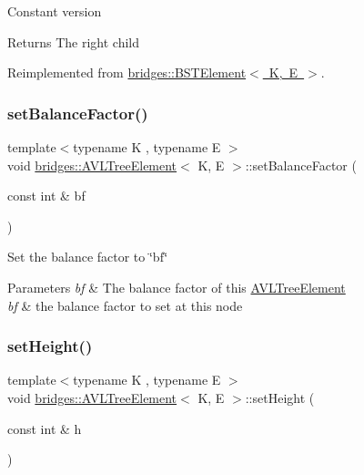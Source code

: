 Constant version

\begin{DoxyReturn}{Returns}
The right child 
\end{DoxyReturn}


Reimplemented from \mbox{\hyperlink{classbridges_1_1_b_s_t_element_ae4e7b750eada97074a42e7f54b320a29}{bridges\+::\+B\+S\+T\+Element$<$ K, E $>$}}.

\mbox{\label{classbridges_1_1_a_v_l_tree_element_a076ec482874d248764348e62dd4652d2}} 
\subsubsection{\texorpdfstring{set\+Balance\+Factor()}{setBalanceFactor()}}
{\footnotesize\ttfamily template$<$typename K , typename E $>$ \\
void \mbox{\hyperlink{classbridges_1_1_a_v_l_tree_element}{bridges\+::\+A\+V\+L\+Tree\+Element}}$<$ K, E $>$\+::set\+Balance\+Factor (\begin{DoxyParamCaption}\item[{const int \&}]{bf }\end{DoxyParamCaption})\hspace{0.3cm}{\ttfamily [inline]}}

Set the balance factor to \char`\"{}bf\char`\"{}
\begin{DoxyParams}{Parameters}
{\em bf} & The balance factor of this \mbox{\hyperlink{classbridges_1_1_a_v_l_tree_element}{A\+V\+L\+Tree\+Element}}\\
\hline
{\em bf} & the balance factor to set at this node \\
\hline
\end{DoxyParams}
\mbox{\label{classbridges_1_1_a_v_l_tree_element_acbf2a222b954e5d9221b109634822f96}} 
\subsubsection{\texorpdfstring{set\+Height()}{setHeight()}}
{\footnotesize\ttfamily template$<$typename K , typename E $>$ \\
void \mbox{\hyperlink{classbridges_1_1_a_v_l_tree_element}{bridges\+::\+A\+V\+L\+Tree\+Element}}$<$ K, E $>$\+::set\+Height (\begin{DoxyParamCaption}\item[{const int \&}]{h }\end{DoxyParamCaption})\hspace{0.3cm}{\ttfamily [inline]}}

